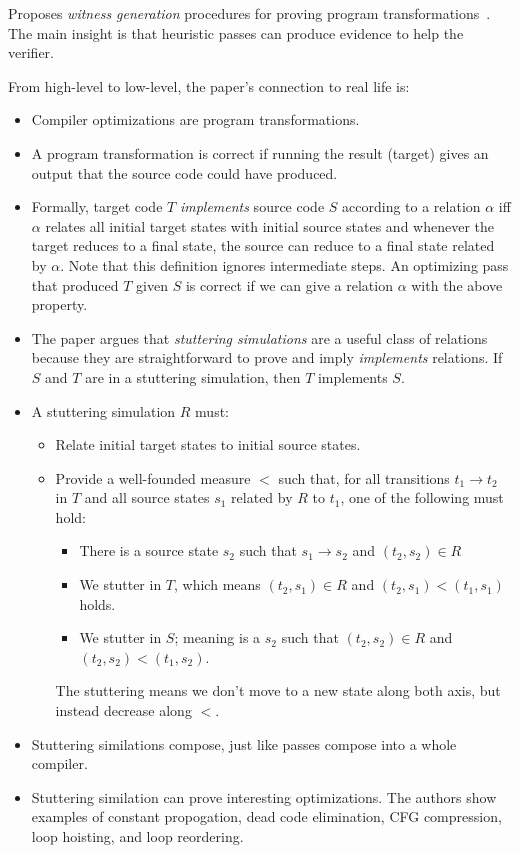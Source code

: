 \documentclass{article}
\begin{document}

Proposes \emph{witness generation} procedures for proving program transformations~\cite{nz-witnessing}.
The main insight is that heuristic passes can produce evidence to help the verifier.

From high-level to low-level, the paper's connection to real life is:
\begin{itemize}
\item Compiler optimizations are program transformations.
\item A program transformation is correct if running the result (target) gives an output
 that the source code could have produced.
\item
  Formally, target code $T$ \emph{implements} source code $S$ according to a relation $\alpha$
   iff $\alpha$ relates all initial target states with initial source states
   and whenever the target reduces to a final state, the source can reduce to a final state related by $\alpha$.
  Note that this definition ignores intermediate steps.
  An optimizing pass that produced $T$ given $S$ is correct if we can give a relation $\alpha$ with the above property.
\item
  The paper argues that \emph{stuttering simulations} are a useful class of relations
   because they are straightforward to prove and imply \emph{implements} relations.
  If $S$ and $T$ are in a stuttering simulation, then $T$ implements $S$.
\item
  A stuttering simulation $R$ must:
  \begin{itemize}
  \item Relate initial target states to initial source states.
  \item
    Provide a well-founded measure $<$ such that, for all transitions $t_1 \rightarrow t_2$ in $T$
     and all source states $s_1$ related by $R$ to $t_1$, one of the following must hold:
    \begin{itemize}
    \item There is a source state $s_2$ such that $s_1 \rightarrow s_2$ and $(t_2, s_2) \in R$
    \item We stutter in $T$, which means $(t_2, s_1) \in R$ and $(t_2, s_1) < (t_1, s_1)$ holds.
    \item We stutter in $S$; meaning is a $s_2$ such that $(t_2, s_2) \in R$ and $(t_2, s_2) < (t_1, s_2)$.
    \end{itemize}
    The stuttering means we don't move to a new state along both axis, but instead decrease along $<$.
  \end{itemize}
\item
  Stuttering similations compose, just like passes compose into a whole compiler.
\item
  Stuttering similation can prove interesting optimizations.
  The authors show examples of constant propogation, dead code elimination, CFG compression, loop hoisting, and loop reordering.
\end{itemize}
\end{document}
